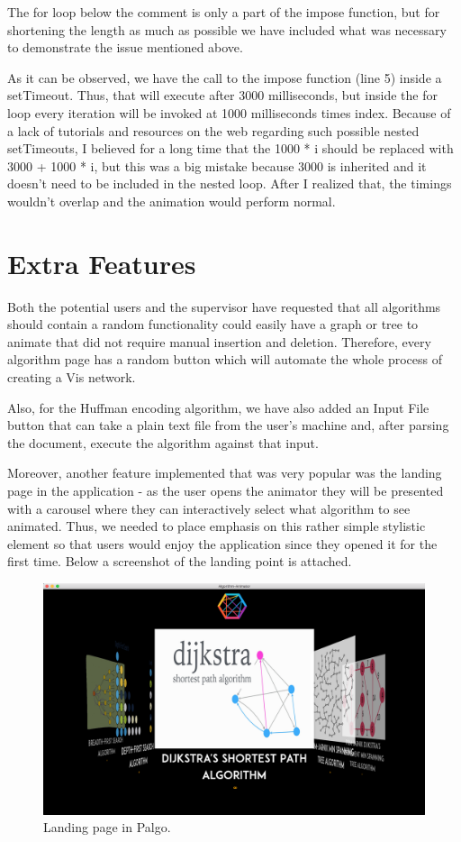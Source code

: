 \documentclass{l4proj}
\begin{document}
The for loop below the comment is only a part of the impose function, but for shortening the length as much as possible
we have included what was necessary to demonstrate the issue mentioned above. 

As it can be observed, we have the call to the impose function (line 5) inside a setTimeout. Thus, that will execute
after 3000 milliseconds, but inside the for loop every iteration will be invoked at 1000 milliseconds times index.
Because of a lack of tutorials and resources on the web regarding such possible nested setTimeouts, I believed for a
long time that the 1000 * i should be replaced with 3000 + 1000 * i, but this was a big mistake because 3000 is
inherited and it doesn't need to be included in the nested loop. After I realized that, the timings wouldn't overlap
and the animation would perform normal.

\section{Extra Features}

Both the potential users and the supervisor have requested that all algorithms should contain a random functionality
could easily have a graph or tree to animate that did not require manual insertion and deletion. Therefore, every
algorithm page has a random button which will automate the whole process of creating a Vis network.

Also, for the Huffman encoding algorithm, we have also added an Input File button that can take a plain text file from
the user's machine and, after parsing the document, execute the algorithm against that input. 

Moreover, another feature implemented that was very popular was the landing page in the application - as
the user opens the animator they will be presented with a carousel where they can interactively select what algorithm
to see animated. Thus, we needed to place emphasis on this rather simple stylistic element so that users would enjoy
the application since they opened it for the first time. Below a screenshot of the landing point is attached.

\begin{figure}[!ht]
    \centering
    \includegraphics[scale=0.3]{landing-page}
    \caption{Landing page in Palgo.}
    \label{fig:landing-page}
\end{figure}
\end{document}
